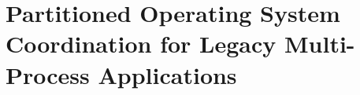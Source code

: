 \declarecommand{\sysname}{\graphene{}}

\chapter{Partitioned Operating System Coordination for Legacy Multi-Process Applications}
\label{chap:graphene}







